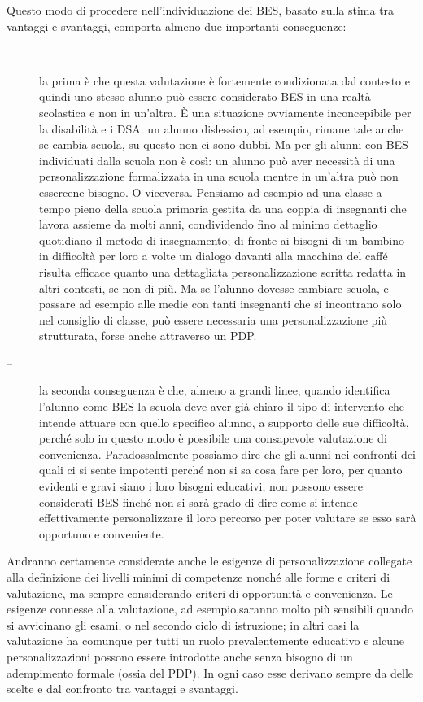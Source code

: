 Questo modo di procedere nell'individuazione dei BES, basato sulla stima tra vantaggi e svantaggi, comporta almeno due importanti conseguenze:
\begin{description}
	\item[--] la prima è che questa valutazione è fortemente condizionata dal contesto e quindi uno stesso alunno può essere considerato BES in una realtà scolastica e non in un'altra. È una situazione ovviamente inconcepibile per la disabilità e i DSA: un alunno dislessico, ad esempio, rimane tale anche se cambia scuola, su questo non ci sono dubbi. Ma per gli alunni con BES individuati dalla scuola non è così: un alunno può aver necessità di una personalizzazione formalizzata in una scuola mentre in un'altra può non essercene bisogno. O viceversa. Pensiamo ad esempio ad una classe a tempo pieno della scuola primaria gestita da una coppia di insegnanti che lavora assieme da molti anni, condividendo fino al minimo dettaglio quotidiano il metodo di insegnamento; di fronte ai bisogni di  un bambino in difficoltà per loro a volte un dialogo davanti alla macchina del caffé risulta efficace quanto una dettagliata personalizzazione scritta redatta in altri contesti, se non di più. Ma se l'alunno dovesse cambiare scuola, e passare ad esempio alle medie con tanti insegnanti che si incontrano solo nel consiglio di classe, può essere necessaria una personalizzazione più strutturata, forse anche attraverso un PDP.
	\item[--] la seconda conseguenza è che, almeno a grandi linee, quando identifica l'alunno come BES la scuola deve aver già chiaro il tipo di intervento che intende attuare con quello specifico alunno, a supporto delle sue difficoltà, perché solo in questo modo è possibile una consapevole valutazione di convenienza. Paradossalmente possiamo dire che gli alunni nei confronti dei quali ci si sente impotenti perché non si sa cosa fare per loro, per quanto evidenti e gravi siano i loro bisogni educativi, non possono essere considerati BES finché non si sarà grado di dire come si intende effettivamente personalizzare il loro percorso per poter valutare se esso sarà opportuno e conveniente.
\end{description}

Andranno certamente considerate anche le esigenze di personalizzazione collegate alla definizione dei livelli minimi di competenze nonché alle forme e criteri di valutazione, ma sempre considerando criteri di opportunità e convenienza. Le esigenze connesse alla valutazione, ad esempio,saranno molto più sensibili quando si avvicinano gli esami, o nel secondo ciclo di istruzione; in altri casi la valutazione ha comunque per tutti un ruolo prevalentemente educativo e alcune personalizzazioni possono essere introdotte anche senza bisogno di un adempimento formale (ossia del PDP). In ogni caso esse derivano sempre da delle scelte e dal confronto tra vantaggi e svantaggi.


